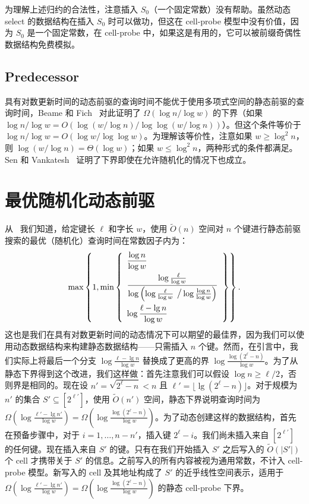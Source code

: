 \documentclass[11pt,a4paper]{ctexart}
\newcommand{\floor}[1]{\lfloor #1 \rfloor}
\begin{document}
为理解上述归约的合法性，注意插入 $S_0$（一个固定常数）没有帮助。虽然动态 select 的数据结构在插入 $S_0$ 时可以做功，但这在 cell-probe 模型中没有价值，因为 $S_0$ 是一个固定常数，在 cell-probe 中，如果这是有用的，它可以被前缀奇偶性数据结构免费模拟。

\subsection{Predecessor}

具有对数更新时间的动态前驱的查询时间不能优于使用多项式空间的静态前驱的查询时间，Beame 和 Fich~\cite[定理3.6及第3.1--2节的归约]{beame02pred} 对此证明了 $\Omega(\log n/\log w)$ 的下界（如果 $\log n/\log w = O(\log(w/\log n)/\log\log(w/\log n))$）。但这个条件等价于 $\log n/\log w = O(\log w/\log\log w)$。为理解该等价性，注意如果 $w \geq \log^2 n$，则 $\log(w/\log n) = \Theta(\log w)$；如果 $w \leq \log^2 n$，两种形式的条件都满足。Sen 和 Vankatesh~\cite{sen08roundelim} 证明了下界即使在允许随机化的情况下也成立。

\section{最优随机化动态前驱}\label{sec:ran-pred}

从~\cite{patrascu06pred,patrascu07randpred} 我们知道，给定键长 $\ell$ 和字长 $w$，使用 $\tilde O(n)$ 空间对 $n$ 个键进行静态前驱搜索的最优（随机化）查询时间在常数因子内为：
\[
\max\left\{1,\min \left\{ \begin{array}{l}
  \dfrac{\log n}{\log w} \\[2ex]
  \dfrac{\log \frac{\ell}{\log w}}{\log \left( \log \frac{\ell}{\log w}
    \textrm{\large~/} \log\frac{\log n}{\log w} \right)} \\[4ex]
  \log \dfrac{\ell - \lg n}{\log w}
\end{array} \right\}\right\}.
\]
这也是我们在具有对数更新时间的动态情况下可以期望的最佳界，因为我们可以使用动态数据结构来构建静态数据结构——只需插入 $n$ 个键。然而，在引言中，我们实际上将最后一个分支 $\log \frac{\ell - \lg n}{\log w}$ 替换成了更高的界 $\log \frac{\log(2^\ell-n)}{\log w}$。为了从静态下界得到这个改进，我们这样做：首先注意我们可以假设 $\log n \geq \ell/2$，否则界是相同的。现在设 $n' = \sqrt{2^\ell-n} < n$ 且 $\ell' = \floor{\lg (2^\ell-n)}$。对于规模为 $n'$ 的集合 $S' \subseteq [2^{\ell'}]$，使用 $\tilde O(n')$ 空间，静态下界说明查询时间为 $\Omega(\log \frac{\ell' - \lg n'}{\log w}) = \Omega(\log \frac{\log(2^\ell-n)}{\log w})$。为了动态创建这样的数据结构，首先在预备步骤中，对于 $i = 1, \dots, n-n'$，插入键 $2^\ell-i$。我们尚未插入来自 $[2^{\ell'}]$ 的任何键。现在插入来自 $S'$ 的键。只有在我们开始插入 $S'$ 之后写入的 $\tilde O(|S'|)$ 个 cell 才携带关于 $S'$ 的信息。之前写入的所有内容被视为通用常数，不计入 cell-probe 模型。新写入的 cell 及其地址构成了 $S'$ 的近乎线性空间表示，适用于 $\Omega(\log \frac{\ell' - \lg n'}{\log w}) = \Omega(\log \frac{\log(2^\ell-n)}{\log w})$ 的静态 cell-probe 下界。
\end{document}
